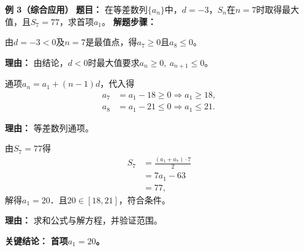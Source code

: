 \begin{examplebox}
	\medskip
	\textbf{\textcolor{CExample}{例 3（综合应用）}}
	\textbf{\textcolor{CExample}{题目：}}
	在等差数列$\{a_n\}$中，$d=-3$，$S_n$在$n=7$时取得最大值，且$S_7=77$，求首项$a_1$。
	\textbf{\textcolor{CExample}{解题步骤：}}
	\begin{description}[style=nextline, leftmargin=2.8em, labelsep=0.5em, itemsep=0.45em]
		\item[\textbf{第一步（最大值条件）：}]
			由$d=-3<0$及$n=7$是最值点，得$a_7\ge0$且$a_8\le0$。
			\par\textbf{理由：} 由结论，$d<0$时最大值要求$a_n\ge0,\ a_{n+1}\le0$。
		\item[\textbf{第二步（化为$a_1$的不等式）：}]
			通项$a_n=a_1+(n-1)d$，代入得
			\[
				\begin{aligned}
					a_7&=a_1-18\ge0\Rightarrow a_1\ge18,\\ a_8&=a_1-21\le0\Rightarrow a_1\le21.
			\end{aligned}
			\]
			\par\textbf{理由：} 等差数列通项。
		\item[\textbf{第三步（列方程求解）：}]
			由$S_7=77$得
			\[
				\begin{aligned}
					S_7&=\frac{(a_1+a_7)\cdot7}{2}\\ &=7a_1-63\\ &=77,
			\end{aligned}
			\]
			解得$a_1=20$．且$20\in[18,21]$，符合条件。
			\par\textbf{理由：} 求和公式与解方程，并验证范围。
	\end{description}
	\textbf{\textcolor{CExample}{关键结论：}}
	\textbf{首项$a_1=20$。}
\end{examplebox}
